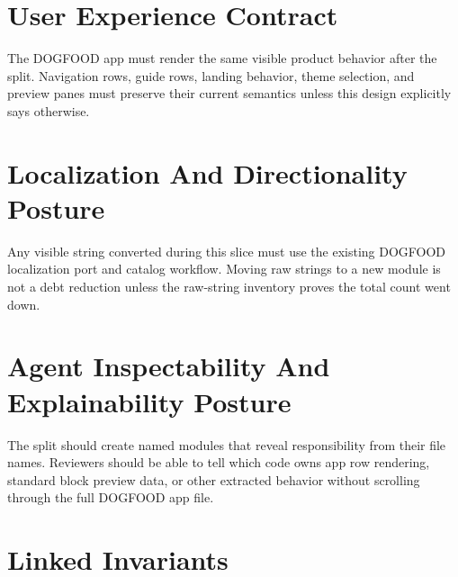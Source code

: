\section{User Experience Contract}\label{record-198-user-experience-contract}

The DOGFOOD app must render the same visible product behavior after the split. Navigation rows, guide rows, landing behavior, theme selection, and preview panes must preserve their current semantics unless this design explicitly says otherwise.

\section{Localization And Directionality Posture}\label{record-198-localization-and-directionality-posture}

Any visible string converted during this slice must use the existing DOGFOOD localization port and catalog workflow. Moving raw strings to a new module is not a debt reduction unless the raw-string inventory proves the total count went down.

\section{Agent Inspectability And Explainability Posture}\label{record-198-agent-inspectability-and-explainability-posture}

The split should create named modules that reveal responsibility from their file names. Reviewers should be able to tell which code owns app row rendering, standard block preview data, or other extracted behavior without scrolling through the full DOGFOOD app file.

\section{Linked Invariants}\label{record-198-linked-invariants}

